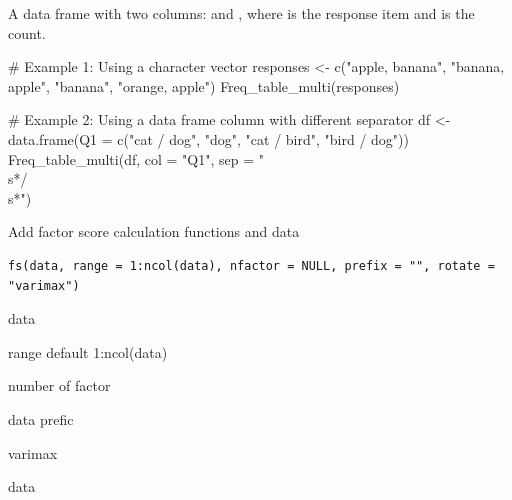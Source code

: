 \documentclass[a4paper]{book}
\begin{document}
%
\begin{Value}
A data frame with two columns:  and , where  is the response item and  is the count.
\end{Value}
%
\begin{Examples}
\begin{ExampleCode}
# Example 1: Using a character vector
responses <- c("apple, banana", "banana, apple", "banana", "orange, apple")
Freq_table_multi(responses)

# Example 2: Using a data frame column with different separator
df <- data.frame(Q1 = c("cat / dog", "dog", "cat / bird", "bird / dog"))
Freq_table_multi(df, col = "Q1", sep = "\\s*/\\s*")
\end{ExampleCode}
\end{Examples}
%
\begin{Description}
Add factor score calculation functions and data
\end{Description}
%
\begin{Usage}
\begin{verbatim}
fs(data, range = 1:ncol(data), nfactor = NULL, prefix = "", rotate = "varimax")
\end{verbatim}
\end{Usage}
%
\begin{Arguments}
\begin{ldescription}
\item[\code{data}] data

\item[\code{range}] range default 1:ncol(data)

\item[\code{nfactor}] number of factor

\item[\code{prefix}] data prefic

\item[\code{rotate}] varimax
\end{ldescription}
\end{Arguments}
%
\begin{Value}
data
\end{Value}
%
\end{document}
